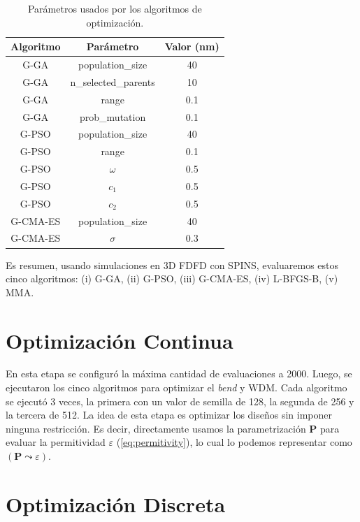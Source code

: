 \begin{table}[ht]
    \centering
    \begin{tabular}{|c|c|c|}
    \hline 
    Algoritmo & Parámetro &  Valor (nm) \\
    \hline
    G-GA & population\_size & 40 \\
    G-GA & n\_selected\_parents & 10 \\
    G-GA & range & 0.1 \\
    G-GA & prob\_mutation & 0.1 \\
    G-PSO & population\_size & 40 \\
    G-PSO & range & 0.1 \\
    G-PSO & $\omega$ & 0.5 \\
    G-PSO & $c_1$ & 0.5 \\
    G-PSO & $c_2$ & 0.5 \\
    G-CMA-ES & population\_size & 40 \\
    G-CMA-ES & $\sigma$ & 0.3 \\
    \hline 
    \end{tabular}
    \caption{Parámetros usados por los algoritmos de optimización.}
    \label{tab:alg-parameters}
\end{table}

Es resumen, usando simulaciones en 3D FDFD con SPINS, evaluaremos estos cinco algoritmos: (i) G-GA, (ii) G-PSO, (iii) G-CMA-ES, (iv) L-BFGS-B, (v) MMA.

\section{Optimización Continua}

En esta etapa se configuró la máxima cantidad de evaluaciones a 2000.
Luego, se ejecutaron los cinco algoritmos para optimizar el \emph{bend} y WDM.
Cada algoritmo se ejecutó 3 veces, la primera con un valor de semilla de 128, la segunda de 256 y
la tercera de 512.
La idea de esta etapa es optimizar los diseños sin imponer ninguna restricción.
Es decir, directamente usamos la parametrización $\boldsymbol{P}$ para evaluar la permitividad 
$\varepsilon$ (\autoref{eq:permitivity}),
lo cual lo podemos representar como $(\boldsymbol{P} \mathrel{\leadsto} \varepsilon)$.

\section{Optimización Discreta}

